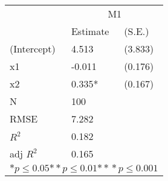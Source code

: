 \begin{tabular}{*{3}{l}}
\hline
                  & \multicolumn{2}{c}{M1}   \tabularnewline
                   &Estimate  &(S.E.)  \tabularnewline
 \hline
 \hline
   (Intercept)     &4.513   &   (3.833) \tabularnewline
   x1              &-0.011   &   (0.176) \tabularnewline
   x2              &0.335*   &   (0.167) \tabularnewline
 \hline
 N                 &100       &        \tabularnewline
 RMSE             &7.282         & \tabularnewline
 $R^2$             &0.182         & \tabularnewline
 adj $R^2$         &0.165         & \tabularnewline
 \hline
\hline
 
 \multicolumn{3}{c}{${*  p}\le 0.05$${*\!\!*  p}\le 0.01$${*\!\!*\!\!*  p}\le 0.001$}\tabularnewline
 \end{tabular}
